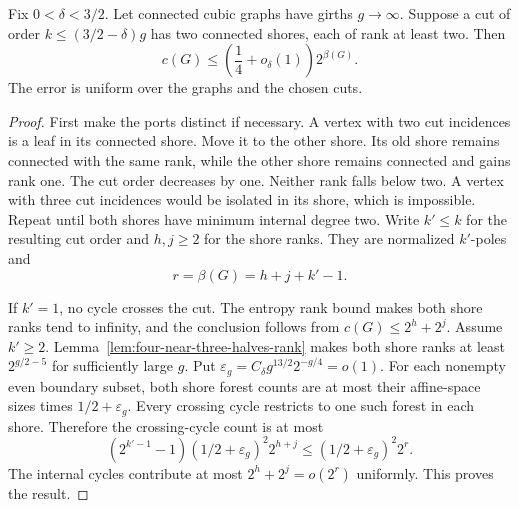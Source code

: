 \begin{corollary}
\label{cor:four-near-three-halves-cuts}
Fix $0<\delta<3/2$.
Let connected cubic graphs have girths $g\to\infty$.
Suppose a cut of order $k\le(3/2-\delta)g$ has two connected shores, each of rank at least two.
Then
\[
 c(G)\le\left(\frac14+o_\delta(1)\right)2^{\beta(G)}.
\]
The error is uniform over the graphs and the chosen cuts.
\end{corollary}

\begin{proof}
First make the ports distinct if necessary.
A vertex with two cut incidences is a leaf in its connected shore.
Move it to the other shore.
Its old shore remains connected with the same rank, while the other shore remains connected and gains rank one.
The cut order decreases by one.
Neither rank falls below two.
A vertex with three cut incidences would be isolated in its shore, which is impossible.
Repeat until both shores have minimum internal degree two.
Write $k'\le k$ for the resulting cut order and $h,j\ge2$ for the shore ranks.
They are normalized $k'$-poles and
\[
 r=\beta(G)=h+j+k'-1.
\]

If $k'=1$, no cycle crosses the cut.
The entropy rank bound makes both shore ranks tend to infinity, and the conclusion follows from $c(G)\le2^h+2^j$.
Assume $k'\ge2$.
Lemma~\ref{lem:four-near-three-halves-rank} makes both shore ranks at least $2^{g/2-5}$ for sufficiently large $g$.
Put $\varepsilon_g=C_\delta g^{13/2}2^{-g/4}=o(1)$.
For each nonempty even boundary subset, both shore forest counts are at most their affine-space sizes times $1/2+\varepsilon_g$.
Every crossing cycle restricts to one such forest in each shore.
Therefore the crossing-cycle count is at most
\[
 (2^{k'-1}-1)(1/2+\varepsilon_g)^2 2^{h+j}
 \le(1/2+\varepsilon_g)^2 2^r.
\]
The internal cycles contribute at most $2^h+2^j=o(2^r)$ uniformly.
This proves the result.
\end{proof}
